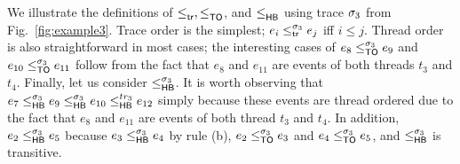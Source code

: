 \begin{example}
\label{ex:hb}
We illustrate the definitions of $\leq^{}_{\mathsf{tr}}, \leq^{}_{\mathsf{TO}}$, and $\leq^{}_{\mathsf{HB}}$ using
trace $\sigma_3$ from Fig.~\ref{fig:example3}. Trace order is the
simplest; $e_i \leq^{\sigma_3}_{\mathsf{tr}} e_j$ iff $i \leq j$. Thread order is also
straightforward in most cases; the interesting cases of
$e_{8} \leq^{\sigma_3}_{\mathsf{TO}} e_9$ and $e_{10} \leq^{\sigma_3}_{\mathsf{TO}} e_{11}$ follow from
the fact that $e_8$ and $e_{11}$ are events of both threads $t_3$ and
$t_4$. Finally, let us consider $\leq^{\sigma_3}_{\mathsf{HB}}$. It is worth observing
that $e_7 \leq^{\sigma_3}_{\mathsf{HB}} e_9 \leq^{\sigma_3}_{\mathsf{HB}} e_{10} \leq^{tr_3}_{\mathsf{HB}} e_{12}$ simply
because these events are thread ordered due to the fact that $e_8$ and
$e_{11}$ are events of both thread $t_3$ and $t_4$. In addition,
$e_2 \leq^{\sigma_3}_{\mathsf{HB}} e_5$ because $e_3 \leq^{\sigma_3}_{\mathsf{HB}} e_4$ by rule (b),
$e_2 \leq^{\sigma_3}_{\mathsf{TO}} e_3$ and $e_4 \leq^{\sigma_3}_{\mathsf{TO}} e_5$, and $\leq^{\sigma_3}_{\mathsf{HB}}$ is
transitive.
\end{example}


